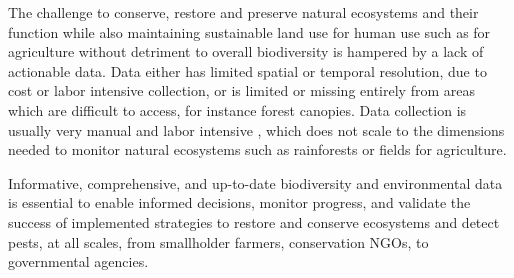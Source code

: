 The challenge to conserve, restore and preserve natural ecosystems and their function while also maintaining sustainable land use for human use such as for agriculture without detriment to overall biodiversity is hampered by a lack of actionable data. Data either has limited spatial or temporal resolution, due to cost or labor intensive collection, or is limited or missing entirely from areas which are difficult to access, for instance forest canopies. Data collection is usually very manual and labor intensive \cite{Cannon2021}, which does not scale to the dimensions needed to monitor natural ecosystems such as rainforests or fields for agriculture. 







Informative, comprehensive, and up-to-date biodiversity and environmental data is essential to enable informed decisions, monitor progress, and validate the success of implemented strategies to restore and conserve ecosystems and detect pests, at all scales, from smallholder farmers, conservation NGOs, to governmental agencies. 



